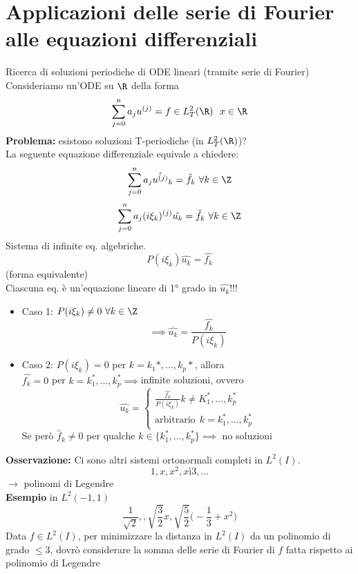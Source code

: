 \section{Applicazioni delle serie di Fourier alle equazioni differenziali}
Ricerca di soluzioni periodiche di ODE lineari (tramite serie di Fourier)
\\Consideriamo un'ODE su $\R$ della forma
\[\sum_{j=0}^{n} a_ju^{(j)}=f\in L^{2}_T(\R)\ \ x\in \R\]
\textbf{Problema:} esistono soluzioni T-periodiche (in $L^{2}_T(\R)$)?
\\La seguente equazione differenziale equivale a chiedere:
\[\sum_{j=0}^{n} a_j\hat{u^{(j)}}_k=\hat{f}_k\ \forall k\in \Z\]
\[\sum_{j=0}^{n} a_j(i\xi_k)^{(j)}\hat{u_k}=\hat{f}_k\ \forall k\in \Z\]
Sistema di infinite eq. algebriche.
\[P(i\xi_k)\hat{u_k}=\hat{f_k}\]
(forma equivalente)
\\Ciascuna eq. è un'equazione lineare di 1° grado in $\hat{u_k}$!!!
\begin{itemize}
	\item Caso 1: $P(i\xi_k)\neq 0\ \forall k\in \Z$ 
		\[\implies \hat{u_k}=\frac{\hat{f_k}}{P(i\xi_k)}\]
	\item Caso 2: $P(i\xi_k)=0$ per $k=k_1*,\ldots,k_p*$, allora
		\\$\hat{f_k}=0$ per $k=k_1^*,\ldots,k_p^*\implies $infinite soluzioni, ovvero
		\[\hat{u_k}=\begin{cases}
		\frac{\hat{f_k}}{P(i\xi_k)} k\neq K_1^*,\ldots,k_p^*
	\\\text{arbitrario}\ \ k=k_1^*,\ldots,k_p^*

\end{cases}\]
Se però $\hat{f}_k\neq 0$ per qualche $k\in \{k_1^*,\ldots,k^*_p\} \implies $ no soluzioni
\end{itemize}
\textbf{Osservazione:} Ci sono altri sistemi ortonormali completi in $L^{2}(I)$.
\[1,x,x^2,xì3,\ldots\]
$\to $ polinomi di Legendre\\
\textbf{Esempio} in $L^2(-1,1)$ 
\[\frac{1}{\sqrt{2} },, \sqrt{\frac{3}{2}} x, \sqrt{\frac{5}{2}} \bigg(-\frac{1}{3}+x^2\bigg)\]
Data $f\in L^{2}(I)$, per minimizzare la distanza in $L^{2}(I)$ da un polinomio di grado $\le 3$, dovrò considerare la somma delle serie di Fourier di  $f$ fatta rispetto ai polinomio di Legendre

